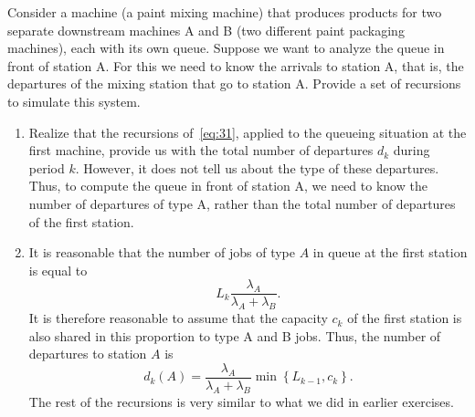 \begin{extra}
  Consider a machine (a paint mixing machine) that produces products for two separate downstream machines A and B (two different paint packaging machines), each with its own queue.
  Suppose we want to analyze the queue in front of station A.
  For this we need to know the arrivals to station A, that is, the departures of the mixing station that go to station A.
  Provide a set of recursions to simulate this system.
\begin{solution}
\begin{enumerate}
\item Realize that the recursions of~\cref{eq:31}, applied to the queueing situation at the first machine, provide us with the total number of departures $d_k$ during period $k$.
  However, it does not tell us about the type of these departures.
  Thus, to compute the queue in front of station A, we need to know the number of departures of type A, rather than the total number of departures of the first station.
\item It is reasonable that the number of jobs of type $A$ in queue at
  the first station is equal to
  \begin{equation*}
  L_k \frac{\lambda_A}{\lambda_A + \lambda_B}.
  \end{equation*}
  It is therefore reasonable to assume that the capacity $c_k$ of the
  first station is also shared in this proportion to type A and B
  jobs. Thus, the number of departures to station $A$ is
  \begin{equation*}
    d_k(A) = \frac{\lambda_A}{\lambda_A+\lambda_B} \min\left\{ L_{k-1}, c_k\right\}.
  \end{equation*}
 The rest of the recursions is very similar to what we did in earlier exercises.
\end{enumerate}
\end{solution}
\end{extra}




